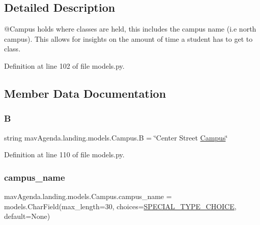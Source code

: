 \subsection{Detailed Description}
\begin{DoxyVerb}@Campus holds where classes are held, this includes the
        campus name (i.e north campus). This allows for insights on
        the amount of time a student has to get to class.
\end{DoxyVerb}
 

Definition at line 102 of file models.\+py.



\subsection{Member Data Documentation}
\mbox{\label{classmavAgenda_1_1landing_1_1models_1_1Campus_a9ff48a7b3dbaf090ab078c9a8cc9cee9}} 
\subsubsection{\texorpdfstring{B}{B}}
{\footnotesize\ttfamily string mav\+Agenda.\+landing.\+models.\+Campus.\+B = \char`\"{}Center Street \mbox{\hyperlink{classmavAgenda_1_1landing_1_1models_1_1Campus}{Campus}}\char`\"{}\hspace{0.3cm}{\ttfamily [static]}}



Definition at line 110 of file models.\+py.

\mbox{\label{classmavAgenda_1_1landing_1_1models_1_1Campus_abe6e6874761cf74ba056896de95a3027}} 
\subsubsection{\texorpdfstring{campus\+\_\+name}{campus\_name}}
{\footnotesize\ttfamily mav\+Agenda.\+landing.\+models.\+Campus.\+campus\+\_\+name = models.\+Char\+Field(max\+\_\+length=30, choices=\mbox{\hyperlink{classmavAgenda_1_1landing_1_1models_1_1Campus_a195ab5d13273734c2c81094080bc6ee5}{S\+P\+E\+C\+I\+A\+L\+\_\+\+T\+Y\+P\+E\+\_\+\+C\+H\+O\+I\+CE}}, default=None)\hspace{0.3cm}{\ttfamily [static]}}



